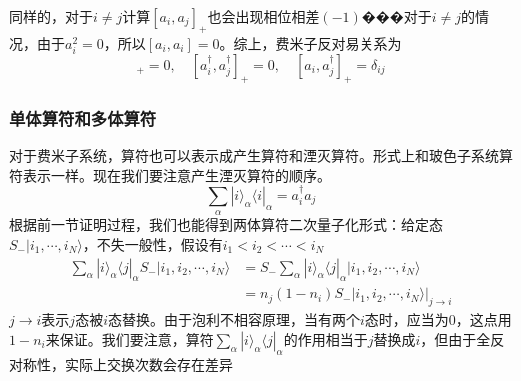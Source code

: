 \documentclass[12pt]{article}
\begin{document}
同样的，对于$i\neq j$计算$[a_i,a_j]_+$也会出现相位相差$(-1)$���对于$i\neq j$的情况，由于$a_i^2=0$，所以$[a_i,a_i]=0$。综上，费米子反对易关系为
\begin{equation*}
    [a_i,a_j]_+=0,\quad[a_i^\dagger,a_j^\dagger]_+=0,\quad[a_i,a_j^\dagger]_+=\delta_{ij}
\end{equation*}
\subsubsection{单体算符和多体算符}
对于费米子系统，算符也可以表示成产生算符和湮灭算符。形式上和玻色子系统算符表示一样。现在我们要注意产生湮灭算符的顺序。
\begin{equation*}
    \sum_{\alpha}|i\rangle_{\alpha}\langle i|_\alpha=a_i^\dagger a_j
\end{equation*}
根据前一节证明过程，我们也能得到两体算符二次量子化形式：给定态$S_-|i_1,\cdots,i_N\rangle$，不失一般性，假设有$i_1<i_2<\cdots<i_N$
\begin{equation*}
    \begin{split}
        \sum_{\alpha}|i\rangle_\alpha\langle j|_\alpha S_-|i_1,i_2,\cdots,i_N\rangle&=S_-\sum_{\alpha}|i\rangle_{\alpha}\langle j|_\alpha |i_1,i_2,\cdots,i_N\rangle\\
        &=n_j(1-n_i)S_-|i_1,i_2,\cdots,i_N\rangle|_{j\to i}
    \end{split}
\end{equation*}
$j\to i$表示$j$态被$i$态替换。由于泡利不相容原理，当有两个$i$态时，应当为0，这点用$1-n_i$来保证。我们要注意，算符$\sum_{\alpha}|i\rangle_\alpha\langle j|_\alpha$的作用相当于$j$替换成$i$，但由于全反对称性，实际上交换次数会存在差异
\end{document}
